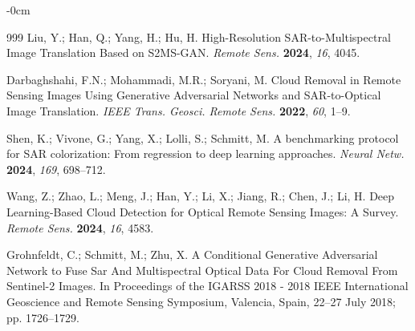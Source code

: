 \documentclass[remotesensing,article,submit,pdftex,moreauthors]{Definitions/mdpi}
\begin{document}
\begin{adjustwidth}{-\extralength}{0cm}
{}


% 


\begin{thebibliography}{999}
Liu, Y.; Han, Q.; Yang, H.; Hu, H. High-Resolution SAR-to-Multispectral Image Translation Based on S2MS-GAN. {\em Remote Sens.} {\bf 2024}, {\em 16}, 4045.

Darbaghshahi, F.N.; Mohammadi, M.R.; Soryani, M. Cloud Removal in Remote Sensing Images Using Generative Adversarial Networks and SAR-to-Optical Image Translation. {\em IEEE Trans. Geosci. Remote Sens.} {\bf 2022}, {\em 60}, 1--9.

Shen, K.; Vivone, G.; Yang, X.; Lolli, S.; Schmitt, M. A benchmarking protocol for SAR colorization: From regression to deep learning approaches. {\em Neural Netw.} {\bf 2024}, {\em 169}, 698--712.

Wang, Z.; Zhao, L.; Meng, J.; Han, Y.; Li, X.; Jiang, R.; Chen, J.; Li, H. Deep Learning-Based Cloud Detection for Optical Remote Sensing Images: A Survey. {\em Remote Sens.} {\bf 2024}, {\em 16}, 4583.

Grohnfeldt, C.; Schmitt, M.; Zhu, X. A Conditional Generative Adversarial Network to Fuse Sar And Multispectral Optical Data For Cloud Removal From Sentinel-2 Images. In Proceedings of the IGARSS 2018 - 2018 IEEE International Geoscience and Remote Sensing Symposium, Valencia, Spain, 22–27 July 2018; pp. 1726--1729.


\end{thebibliography}
\end{adjustwidth}
\end{document}
